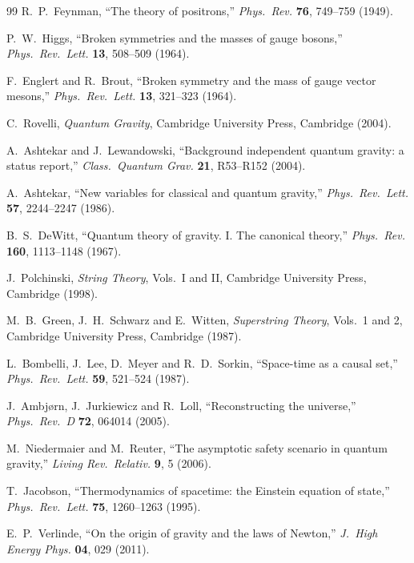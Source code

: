 \documentclass[a4paper]{article}
\begin{document}
\begin{thebibliography}{99}
R.~P.~Feynman,
``The theory of positrons,''
\textit{Phys.\ Rev.} \textbf{76}, 749--759 (1949).

P.~W.~Higgs,
``Broken symmetries and the masses of gauge bosons,''
\textit{Phys.\ Rev.\ Lett.} \textbf{13}, 508--509 (1964).

F.~Englert and R.~Brout,
``Broken symmetry and the mass of gauge vector mesons,''
\textit{Phys.\ Rev.\ Lett.} \textbf{13}, 321--323 (1964).

C.~Rovelli,
\textit{Quantum Gravity},
Cambridge University Press, Cambridge (2004).

A.~Ashtekar and J.~Lewandowski,
``Background independent quantum gravity: a status report,''
\textit{Class.\ Quantum Grav.} \textbf{21}, R53--R152 (2004).

A.~Ashtekar,
``New variables for classical and quantum gravity,''
\textit{Phys.\ Rev.\ Lett.} \textbf{57}, 2244--2247 (1986).

B.~S.~DeWitt,
``Quantum theory of gravity. I. The canonical theory,''
\textit{Phys.\ Rev.} \textbf{160}, 1113--1148 (1967).

J.~Polchinski,
\textit{String Theory}, Vols.\ I and II,
Cambridge University Press, Cambridge (1998).

M.~B.~Green, J.~H.~Schwarz and E.~Witten,
\textit{Superstring Theory}, Vols.\ 1 and 2,
Cambridge University Press, Cambridge (1987).

L.~Bombelli, J.~Lee, D.~Meyer and R.~D.~Sorkin,
``Space-time as a causal set,''
\textit{Phys.\ Rev.\ Lett.} \textbf{59}, 521--524 (1987).

J.~Ambj{\o}rn, J.~Jurkiewicz and R.~Loll,
``Reconstructing the universe,''
\textit{Phys.\ Rev.\ D} \textbf{72}, 064014 (2005).

M.~Niedermaier and M.~Reuter,
``The asymptotic safety scenario in quantum gravity,''
\textit{Living Rev.\ Relativ.} \textbf{9}, 5 (2006).

T.~Jacobson,
``Thermodynamics of spacetime: the Einstein equation of state,''
\textit{Phys.\ Rev.\ Lett.} \textbf{75}, 1260--1263 (1995).

E.~P.~Verlinde,
``On the origin of gravity and the laws of Newton,''
\textit{J.\ High Energy Phys.} \textbf{04}, 029 (2011).


\end{thebibliography}
\end{document}
